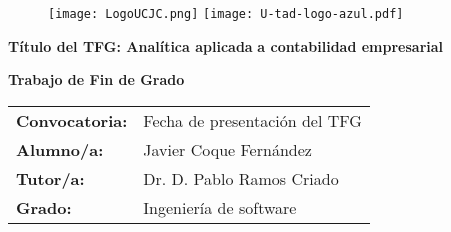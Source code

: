 \thispagestyle{empty}


\phantom{xxxx}
\vspace{-2.0cm}
\begin{figure}
		\hspace{1cm}\texttt{[image: LogoUCJC.png]} \hspace{3cm}
		\texttt{[image: U-tad-logo-azul.pdf]} \\[3.4cm]
\end{figure}


\begin{center}

{\Huge {\textbf{Título del TFG: Analítica aplicada}}}
\vspace{0.20cm}
{\Huge {\textbf{a contabilidad empresarial}}}
\end{center}


\begin{center}
{\Huge {\textbf{Trabajo de Fin de Grado}}}
\end{center}


\renewcommand{\arraystretch}{1.5}

\begin{longtable}{l p{13.7cm}}
	{\Large \textbf{Convocatoria: }} & {\Large Fecha de presentación del TFG}\\[0.3cm]
{\Large \textbf{Alumno/a: }}& {\Large Javier Coque Fernández} \\[0.3cm]
	{\Large \textbf{Tutor/a: }}  & {\Large Dr. D. Pablo Ramos Criado} \\[0.3cm]
	{\Large \textbf{Grado: }} & {\Large Ingeniería de software} \\
\end{longtable}






